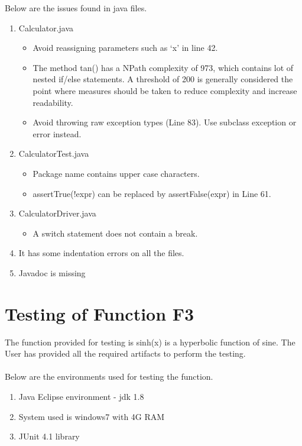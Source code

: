 \documentclass[12pt]{report}
\begin{document}
Below are the issues found in java files.
\begin{enumerate}
    \item Calculator.java
    \begin{itemize}
        \item Avoid reassigning parameters such as ‘x’ in line 42.
        \item The method tan() has a NPath complexity of 973, which contains lot of nested if/else statements. A threshold of 200 is generally considered the point where measures should be taken to reduce complexity and increase readability.
        \item Avoid throwing raw exception types (Line 83). Use subclass exception or error instead.
    \end{itemize}
    \item CalculatorTest.java
    \begin{itemize}
        \item Package name contains upper case characters.
        \item assertTrue(!expr) can be replaced by assertFalse(expr) in Line 61.
    \end{itemize}
    \item CalculatorDriver.java
    \begin{itemize}
        \item A switch statement does not contain a break.
    \end{itemize}
    \item It has some indentation errors on all the files.
    \item Javadoc is missing
\end{enumerate}

\newpage
\section{Testing of Function F3}
The function provided for testing is sinh(x) is a hyperbolic function of sine. The User has provided all the required artifacts to perform the testing.

\paragraph{}Below are the environments used for testing the function.
\begin{enumerate}
    \item Java Eclipse environment - jdk 1.8
    \item System used is windows7 with 4G RAM
    \item JUnit 4.1 library
\end{enumerate}
\end{document}
